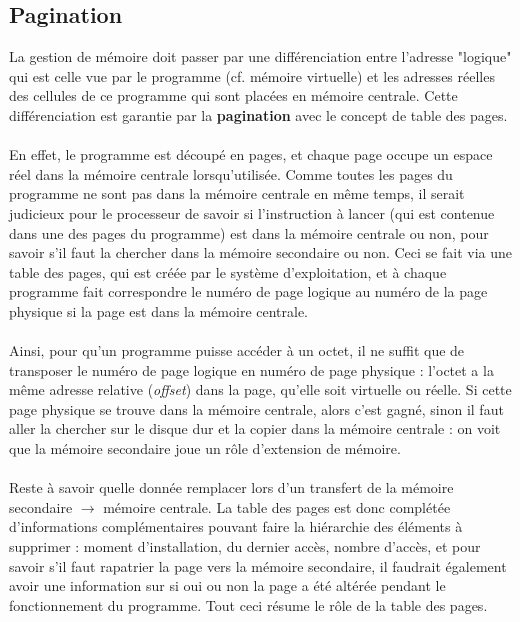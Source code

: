 \documentclass[12pt,a4paper]{report}
\begin{document}
\subsection{Pagination} \label{subsection:pagination}
La gestion de mémoire doit passer par une différenciation entre l'adresse "logique" qui est celle vue par le programme (cf. mémoire virtuelle) et les adresses réelles des cellules de ce programme qui sont placées en mémoire centrale. Cette différenciation est garantie par la \textbf{pagination} avec le concept de table des pages. \\ \\
En effet, le programme est découpé en pages, et chaque page occupe un espace réel dans la mémoire centrale lorsqu'utilisée. Comme toutes les pages du programme ne sont pas dans la mémoire centrale en même temps, il serait judicieux pour le processeur de savoir si l'instruction à lancer (qui est contenue dans une des pages du programme) 
est dans la mémoire centrale ou non, pour savoir s'il faut la chercher dans la mémoire secondaire ou non. Ceci se fait via une table des pages, qui est créée par le système d'exploitation, et à chaque programme fait correspondre le numéro de page logique au numéro de la page physique si la page est dans la mémoire centrale. \\
\\
Ainsi, pour qu'un programme puisse accéder à un octet, il ne suffit que de transposer le numéro de page logique en numéro de page physique : l'octet a la même adresse relative (\textit{offset}) dans la page, qu'elle soit virtuelle ou réelle. Si cette page physique se trouve dans la mémoire centrale, alors c'est gagné, sinon il faut aller la chercher sur le disque dur et la copier dans la mémoire centrale : on voit que la mémoire secondaire joue un rôle d'extension de mémoire. \\
\\
Reste à savoir quelle donnée remplacer lors d'un transfert de la mémoire secondaire $\longrightarrow$ mémoire centrale. La table des pages est donc complétée d'informations complémentaires pouvant faire la hiérarchie des éléments à supprimer : moment d'installation, du dernier accès, nombre d'accès, et pour savoir s'il faut rapatrier la page vers la mémoire secondaire, il faudrait également avoir une information sur si oui ou non la page a été altérée pendant le fonctionnement du programme. Tout ceci résume le rôle de la table des pages.
\end{document}
